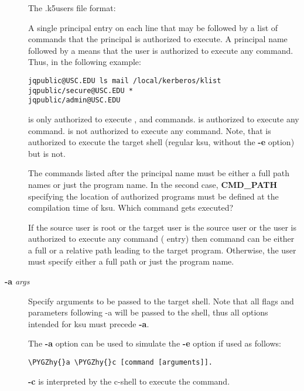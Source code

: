 \documentclass[letterpaper,10pt,english]{sphinxmanual}
\def\PYGZhy{\char`\-}
\begin{document}
\begin{description}
The .k5users file format:

A single principal entry on each line that may be followed by a
list of commands that the principal is authorized to execute.  A
principal name followed by a \code{*} means that the user is
authorized to execute any command.  Thus, in the following
example:

\begin{Verbatim}[commandchars=\\\{\}]
jqpublic@USC.EDU ls mail /local/kerberos/klist
jqpublic/secure@USC.EDU *
jqpublic/admin@USC.EDU
\end{Verbatim}

 is only authorized to execute ,
 and  commands.   is
authorized to execute any command.   is
not authorized to execute any command.  Note, that
 is authorized to execute the target
shell (regular ksu, without the \textbf{-e} option) but
 is not.

The commands listed after the principal name must be either a full
path names or just the program name.  In the second case,
\textbf{CMD\_PATH} specifying the location of authorized programs must
be defined at the compilation time of ksu.  Which command gets
executed?

If the source user is root or the target user is the source user
or the user is authorized to execute any command (\code{*} entry)
then command can be either a full or a relative path leading to
the target program.  Otherwise, the user must specify either a
full path or just the program name.

\item[{\textbf{-a} \emph{args}}] \leavevmode
Specify arguments to be passed to the target shell.  Note that all
flags and parameters following -a will be passed to the shell,
thus all options intended for ksu must precede \textbf{-a}.

The \textbf{-a} option can be used to simulate the \textbf{-e} option if
used as follows:

\begin{Verbatim}[commandchars=\\\{\}]
\PYGZhy{}a \PYGZhy{}c [command [arguments]].
\end{Verbatim}

\textbf{-c} is interpreted by the c-shell to execute the command.

\end{description}
\end{document}
